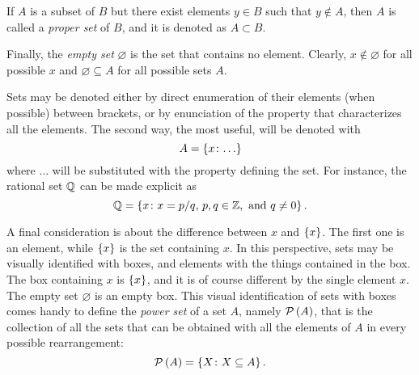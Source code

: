 If $A$ is a subset of $B$ but there exist elements $y \in B$ such that $y \notin A$, then $A$ is called a  \emph{proper set}  of $B$, and it is denoted as $A \subset B$.

Finally, the \emph{empty set} $\varnothing$ is the set that contains no element. Clearly, $x \notin \varnothing$ for all possible $x$ and $\varnothing \subseteq A$ for all possible sets $A$.

Sets may be denoted either by direct enumeration of their elements (when possible) between brackets, or by enunciation of the property that characterizes all the elements. The second way, the most useful, will be denoted with
\begin{equation*}
	A = \left\lbrace x \colon . \, . \, . \right\rbrace
\end{equation*}
where $. . .$ will be substituted with the property defining the set. For instance, the rational set $\mathbb{ Q}$ can be made explicit as
\begin{equation*}
	\mathbb{ Q} = \left\lbrace x \colon x=p/q, \, p,q \in \mathbb{ Z}, \text{ and } q \neq 0 \right\rbrace.
\end{equation*}

A final consideration is about the difference between $x$ and $\left\lbrace x \right\rbrace$. The first one is an element, while $\left\lbrace x \right\rbrace$ is the set containing $x$. In this perspective, sets may be visually identified with boxes, and elements with the things contained in the box. The box containing $x$ is $\left\lbrace x \right\rbrace$, and it is of course different by the single element $x$. The empty set $\varnothing$ is an empty box. This visual identification of sets with boxes comes handy to define the \emph{power set} of a set $A$, namely $\mathcal{P}\left( A \right)$, that is the collection of all the sets that can be obtained with all the elements of $A$ in every possible rearrangement:
\begin{equation}
	\mathcal{P}\left( A \right) = \left\lbrace X \colon X \subseteq A \right\rbrace.
\end{equation}

